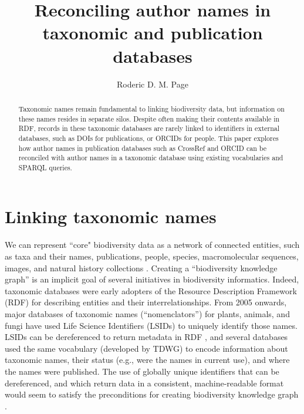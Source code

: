 \documentclass[runningheads]{llncs}
\begin{document}
%
\title{Reconciling author names in taxonomic and publication databases}
%
%
\author{Roderic D. M. Page}
%

%
\maketitle              %
%
\begin{abstract}
Taxonomic names remain fundamental to linking biodiversity data, but information on these names resides in separate silos. Despite often making their contents available in RDF, records in these taxonomic databases are rarely linked to identifiers in external databases, such as DOIs for publications, or ORCIDs for people. This paper explores how author names in publication databases such as CrossRef and ORCID can be reconciled with author names in a taxonomic database using existing vocabularies and SPARQL queries.

\end{abstract}

\section{Linking taxonomic names}

We can represent ``core" biodiversity data as a network of connected entities, such as taxa and their names, publications, people, species, macromolecular sequences, images, and natural history collections \cite{page_towards_2016}. Creating a “biodiversity knowledge graph” is an implicit goal of several initiatives in biodiversity informatics. Indeed, taxonomic databases were early adopters of the Resource Description Framework (RDF) for describing entities and their interrelationships. From 2005 onwards, major databases of taxonomic names (“nomenclators”) for plants, animals, and fungi have used Life Science Identifiers (LSIDs) \cite{clark_globally_2004} to uniquely identify those names. LSIDs can be dereferenced to return metadata in RDF \cite{page_lsid_2008}, and several databases used the same vocabulary (developed by TDWG) to encode information about taxonomic names, their status (e.g., were the names in current use), and where the names were published. The use of globally unique identifiers that can be dereferenced, and which return data in a consistent, machine-readable format would seem to satisfy the preconditions for creating biodiversity knowledge graph \cite{page_towards_2016}. 
\end{document}
